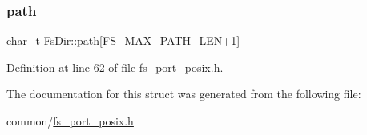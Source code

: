 \subsubsection{\texorpdfstring{path}{path}}
{\footnotesize\ttfamily \hyperlink{compiler__port_8h_a40bb5262bf908c328fbcfbe5d29d0201}{char\+\_\+t} Fs\+Dir\+::path\mbox{[}\hyperlink{fs__port__posix_8h_aa0c6c8abe007b3bb148f7fa90f8efb39}{F\+S\+\_\+\+M\+A\+X\+\_\+\+P\+A\+T\+H\+\_\+\+L\+EN}+1\mbox{]}}



Definition at line 62 of file fs\+\_\+port\+\_\+posix.\+h.



The documentation for this struct was generated from the following file\+:\begin{DoxyCompactItemize}
\item 
common/\hyperlink{fs__port__posix_8h}{fs\+\_\+port\+\_\+posix.\+h}\end{DoxyCompactItemize}
